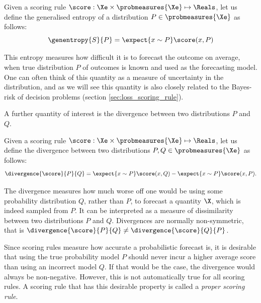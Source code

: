\begin{definition}
Given a scoring rule $\score:\Xe\times\probmeasures{\Xe}\mapsto\Reals$, let us define the generalised entropy of a distribution $P\in\probmeasures{\Xe}$ as follows:
\begin{equation}
	\genentropy{S}{P}= \expect{x\sim P} \score(x,P)
\end{equation}
\end{definition}


This entropy measures how difficult it is to forecast the outcome on average, when true distribution $P$ of outcomes is known and used as the forecasting model. One can often think of this quantity as a measure of uncertainty in the distribution, and as we will see this quantity is also closely related to the Bayes-risk of decision problems (section \ref{sec:loss_scoring_rule}).

A further quantity of interest is the divergence between two distributions $P$ and $Q$.

\begin{definition}\label{def:generalised_divergence}
Given a scoring rule $\score:\Xe\times\probmeasures{\Xe}\mapsto\Reals$, let us define the divergence between two distributions $P,Q\in\probmeasures{\Xe}$ as follows:
	\begin{equation}
		\divergence{\score}{P}{Q} = \expect{x\sim P} \score(x,Q) - \expect{x\sim P} \score(x,P)\mbox{.}\label{eqn:def_divergence}
	\end{equation}
\end{definition}

The divergence measures how much worse off one would be using some probability distribution $Q$, rather than $P$, to forecast a quantity $\X$, which is indeed sampled from $P$. It can be interpreted as a measure of dissimilarity between two distributions $P$ and $Q$. Divergences are normally non-symmetric, that is $\divergence{\score}{P}{Q} \neq \divergence{\score}{Q}{P}$.

Since scoring rules measure how accurate a probabilistic forecast is, it is desirable that using the true probability model $P$ should never incur a higher average score than using an incorrect model $Q$. If that would be the case, the divergence would always be non-negative. However, this is not automatically true for all scoring rules. A scoring rule that has this desirable property is called a \emph{proper scoring rule}.

